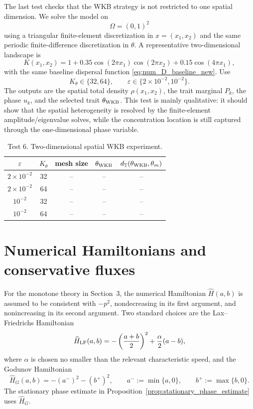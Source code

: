 \documentclass[11pt]{article}
\begin{document}
The last test checks that the WKB strategy is not restricted to one spatial dimension.  We solve the model on
\[
    \Omega=(0,1)^2
\]
using a triangular finite-element discretization in \(x=(x_1,x_2)\) and the same periodic finite-difference discretization in \(\theta\).  A representative two-dimensional landscape is
\begin{equation}\label{eq:K_2d_new}
    K(x_1,x_2)=1+0.35\cos(2\pi x_1)\cos(2\pi x_2)+0.15\cos(4\pi x_1),
\end{equation}
with the same baseline dispersal function \eqref{eq:num_D_baseline_new}.  Use
\[
    K_\theta\in\{32,64\},
    \qquad
    \varepsilon\in\{2\times10^{-2},10^{-2}\}.
\]
The outputs are the spatial total density \(\rho(x_1,x_2)\), the trait marginal \(P_k\), the phase \(u_k\), and the selected trait \(\theta_{\rm WKB}\).  This test is mainly qualitative: it should show that the spatial heterogeneity is resolved by the finite-element amplitude/eigenvalue solves, while the concentration location is still captured through the one-dimensional phase variable.

\begin{table}[ht]
\centering
\caption{Test 6. Two-dimensional spatial WKB experiment.}
\begin{tabular}{ccccc}
\toprule
$\varepsilon$ & $K_\theta$ & mesh size & $\theta_{\rm WKB}$ & $d_{\mathbb T}(\theta_{\rm WKB},\theta_m)$\\
\midrule
$2\times10^{-2}$ & 32 & -- & -- & --\\
$2\times10^{-2}$ & 64 & -- & -- & --\\
$10^{-2}$ & 32 & -- & -- & --\\
$10^{-2}$ & 64 & -- & -- & --\\
\bottomrule
\end{tabular}
\end{table}



\appendix

\section{Numerical Hamiltonians and conservative fluxes}
\label{app:hamiltonian_flux}

For the monotone theory in Section~3, the numerical Hamiltonian
\(\widehat H(a,b)\) is assumed to be consistent with \(-p^2\), nondecreasing in
its first argument, and nonincreasing in its second argument.  Two standard
choices are the Lax--Friedrichs Hamiltonian
\begin{equation}
\label{eq:app_LF_H}
    \widehat H_{\rm LF}(a,b)
    =
    -\left(\frac{a+b}{2}\right)^2
    +
    \frac{\alpha}{2}(a-b),
\end{equation}
where \(\alpha\) is chosen no smaller than the relevant characteristic speed,
and the Godunov Hamiltonian
\begin{equation}
\label{eq:app_Godunov_H}
    \widehat H_G(a,b)
    =
    -(a^-)^2-(b^+)^2,
    \qquad
    a^-:=\min\{a,0\},
    \qquad
    b^+:=\max\{b,0\}.
\end{equation}
The stationary phase estimate in
Proposition~\ref{prop:stationary_phase_estimate} uses
\(\widehat H_G\).
\end{document}
